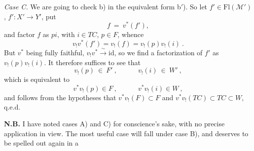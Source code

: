 \documentclass[11pt]{article}
\newcommand{\printedpage}[1]{\marginpar{\footnotesize p.~#1}}
\newcommand{\msp}[1]{\marginpar{\footnotesize [#1]}}
\newcommand{\M}{\mathcal{M}}
\newcommand{\Fl}{\mathrm{Fl}}
\begin{document}
\textit{Case C.} We are going to check b) in the equivalent form b$'$). So let $f' \in \Fl(\M')$, $f' : X' \longrightarrow Y'$,
\printedpage{12}
\msp{page 19}
put
\[
f\ =\ v^*(f'),
\]
and factor $f$ as $pi$, with $i \in TC$, $p \in F$, whence
\[
v_!v^*(f') = v_!(f) = v_!(p)v_!(i)\ .
\]
But $v^*$ being fully faithful, $v_!v^* \xrightarrow{\ \sim\ } \mathrm{id}$, so we find a factorization of $f'$ as $v_!(p)v_!(i)$. It therefore suffices to see that
\[
v_!(p)\ \in\ F'\ ,\qquad\quad v_!(i)\ \in\ W'\ ,
\]
which is equivalent to
\[
v^*v_!(p) \in F\ ,\qquad\quad v^*v_!(i) \in W\ ,
\]
and follows from the hypotheses that $v^*v_!(F) \subset F$ and $v^*v_!(TC) \subset TC \subset W$, q.e.d.

\textbf{N.B.} I have noted cases A) and C) for conscience's sake, with no precise application in view. The most useful case will fall under case B), and deserves to be spelled out again in a
\end{document}
